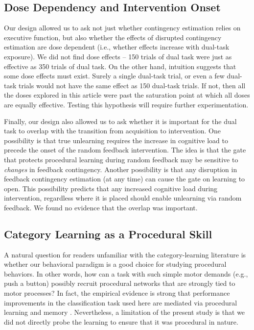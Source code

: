 \documentclass[apacite,draftfirst,man]{apa6}
\begin{document}
\subsection*{Dose Dependency and Intervention Onset}
Our design allowed us to ask not just whether contingency estimation relies on
executive function, but also whether the effects of disrupted contingency
estimation are dose dependent (i.e., whether effects increase with dual-task
exposure). We did not find dose effects -- 150 trials of dual task were just as
effective as 350 trials of dual task. On the other hand, intuition suggests that
some dose effects must exist. Surely a single dual-task trial, or even a few
dual-task trials would not have the same effect as 150 dual-task trials. If not,
then all the doses explored in this article were past the saturation point at
which all doses are equally effective. Testing this hypothesis will require
further experimentation.

Finally, our design also allowed us to ask whether it is important for the dual
task to overlap with the transition from acquisition to intervention. One
possibility is that true unlearning requires the increase in cognitive load to
precede the onset of the random feedback intervention. The idea is that the gate
that protects procedural learning during random feedback may be sensitive to
\textit{changes} in feedback contingency. Another possibility is that any
disruption in feedback contingency estimation (at any time) can cause the gate
on learning to open. This possibility predicts that any increased cognitive load
during intervention, regardless where it is placed should enable unlearning via
random feedback. We found no evidence that the overlap was important.

\subsection*{Category Learning as a Procedural Skill}
A natural question for readers unfamiliar with the category-learning literature
is whether our behavioral paradigm is a good choice for studying procedural
behaviors. In other words, how can a task with such simple motor demands (e.g.,
push a button) possibly recruit procedural networks that are strongly tied to
motor processes? In fact, the empirical evidence is strong that performance
improvements in the classification task used here are mediated via procedural
learning and memory \cite{AshbyMaddox2005, AshbyMaddox2010, AshbyValentin2016a}.
Nevertheless, a limitation of the present study is that we did not directly
probe the learning to ensure that it was procedural in nature.
\end{document}
